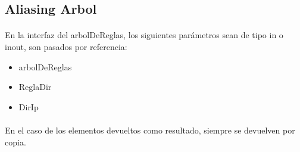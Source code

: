 \subsection*{Aliasing Arbol}

\paragraph{}
En la interfaz del arbolDeReglas, los siguientes par\'ametros sean de tipo in o inout, son pasados por referencia:
\begin{itemize}
 \item arbolDeReglas
 \item ReglaDir
 \item DirIp 
\end{itemize}

\paragraph{}
En el caso de los elementos devueltos como resultado, siempre se devuelven por copia.